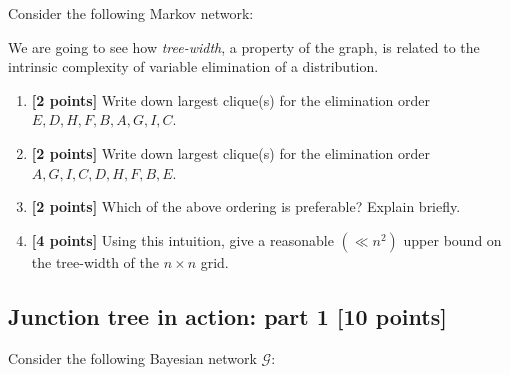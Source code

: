 \documentclass[12pt]{article}
\newcommand{\Gcal}{\mathcal{G}}
\begin{document}
Consider the following Markov network:

\begin{figure}[h]
\centering
{}
\end{figure}


We are going to see how \emph{tree-width}, a property of the graph, is related to the intrinsic complexity of variable elimination of a distribution. 


\begin{enumerate}

\item \textbf{[2 points]} Write down largest clique(s) for the elimination order $ E, D, H, F, B, A, G, I, C $.



\item \textbf{[2 points]} Write down largest clique(s) for the elimination order $ A, G, I, C, D, H, F, B, E $. 



\item \textbf{[2 points]} Which of the above ordering is preferable? Explain briefly. 



\item \textbf{[4 points]} Using this intuition, give a reasonable $ (\ll n^2) $ upper bound on the tree-width of the $ n \times n $ grid. 



\end{enumerate}

\subsection{Junction tree in action: part 1 [10 points]}



Consider the following Bayesian network $ \Gcal $:
\begin{figure}[h]
\centering
{}
\end{figure}
\end{document}
